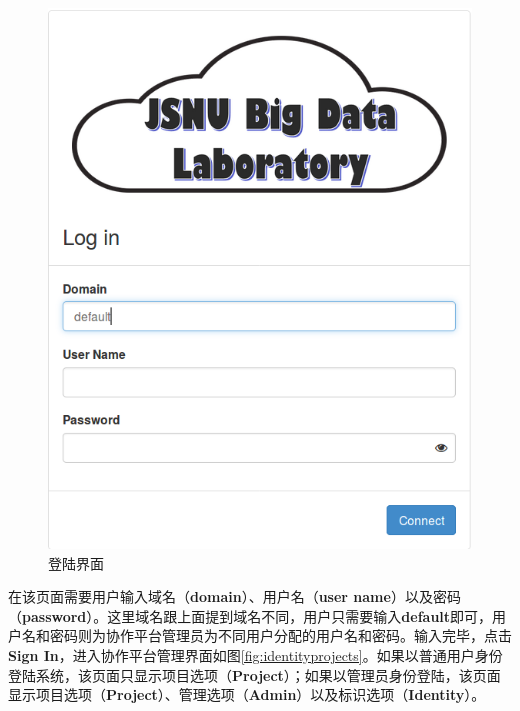 \documentclass[12pt]{article}
\begin{document}
\begin{figure}[!htb]
\centering
\includegraphics[width=6in]{./figures/login}
\caption{登陆界面}
\label{fig:login}
\end{figure}
在该页面需要用户输入域名（\textbf{domain}）、用户名（\textbf{user name}）以及密码（\textbf{password}）。这里域名跟上面提到域名不同，用户只需要输入\textbf{default}即可，用户名和密码则为协作平台管理员为不同用户分配的用户名和密码。输入完毕，点击\textbf{Sign In}，进入协作平台管理界面如图\ref{fig:identityprojects}。如果以普通用户身份登陆系统，该页面只显示项目选项（\textbf{Project}）；如果以管理员身份登陆，该页面显示项目选项（\textbf{Project}）、管理选项（\textbf{Admin}）以及标识选项（\textbf{Identity}）。
\end{document}
